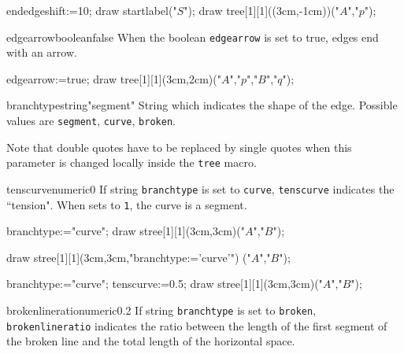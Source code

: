 \documentclass[11pt,a4paper,english]{article}
\begin{document}
\begin{exemple}[lefthand ratio=0.65]
 endedgeshift:=10;
 draw startlabel("$S$");
 draw tree[1][1]((3cm,-1cm))("$A$","$p$");
\end{exemple}

\begin{mptparam}{edgearrow}{boolean}{false}
When the boolean \verb|edgearrow| is set to true, edges end with an arrow.
\end{mptparam}

\begin{exemple}[lefthand ratio=0.65]
 edgearrow:=true;
 draw tree[1][1](3cm,2cm)("$A$","$p$","$B$","$q$");
\end{exemple}

\begin{mptparam}{branchtype}{string}{"segment"}
String which indicates the shape of the edge. Possible values are  \verb|segment|, \verb|curve|, \verb|broken|.

Note that double quotes have to be replaced by single quotes when this parameter is changed locally inside the \verb|tree| macro.
\end{mptparam}


\begin{mptparam}{tenscurve}{numeric}{0}
 If string \verb|branchtype| is set to \verb|curve|, \verb|tenscurve| indicates the ``tension". When sets to \verb|1|, the curve is a segment.
 \end{mptparam}

\begin{exemple}[lefthand ratio=0.6]
 branchtype:="curve";
 draw stree[1][1](3cm,3cm)("$A$","$B$");
\end{exemple}


\begin{exemple}[lefthand ratio=0.6]
 draw stree[1][1](3cm,3cm,"branchtype:='curve'")
                                         ("$A$","$B$");
\end{exemple}



\begin{exemple}[lefthand ratio=0.6]
 branchtype:="curve";
 tenscurve:=0.5;
 draw stree[1][1](3cm,3cm)("$A$","$B$");
\end{exemple}


\begin{mptparam}{brokenlineratio}{numeric}{0.2}
 If string \verb|branchtype| is set to \verb|broken|, \verb|brokenlineratio| indicates the ratio between the length of the first segment of the broken line and the total length of the horizontal space.
 \end{mptparam}
 
\end{document}
